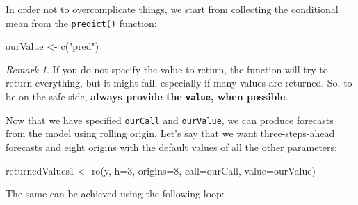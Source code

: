 \documentclass[
]{book}
\newenvironment{Shaded}{\begin{snugshade}}{\end{snugshade}}
\newcommand{\AttributeTok}[1]{\textcolor[rgb]{0.77,0.63,0.00}{#1}}
\newcommand{\DecValTok}[1]{\textcolor[rgb]{0.00,0.00,0.81}{#1}}
\newcommand{\FunctionTok}[1]{\textcolor[rgb]{0.00,0.00,0.00}{#1}}
\newcommand{\NormalTok}[1]{#1}
\newcommand{\OtherTok}[1]{\textcolor[rgb]{0.56,0.35,0.01}{#1}}
\newcommand{\StringTok}[1]{\textcolor[rgb]{0.31,0.60,0.02}{#1}}
\theoremstyle{definition}
\theoremstyle{definition}
\theoremstyle{definition}
\theoremstyle{definition}
\theoremstyle{remark}
\newtheorem*{remark}{Remark}
\begin{document}
In order not to overcomplicate things, we start from collecting the conditional mean from the \texttt{predict()} function:

\begin{Shaded}
\begin{Highlighting}[]
\NormalTok{ourValue }\OtherTok{\textless{}{-}} \FunctionTok{c}\NormalTok{(}\StringTok{"pred"}\NormalTok{)}
\end{Highlighting}
\end{Shaded}

\begin{remark}
If you do not specify the value to return, the function will try to return everything, but it might fail, especially if many values are returned. So, to be on the safe side, \textbf{always provide the \texttt{value}, when possible}.
\end{remark}

Now that we have specified \texttt{ourCall} and \texttt{ourValue}, we can produce forecasts from the model using rolling origin. Let's say that we want three-steps-ahead forecasts and eight origins with the default values of all the other parameters:

\begin{Shaded}
\begin{Highlighting}[]
\NormalTok{returnedValues1 }\OtherTok{\textless{}{-}} \FunctionTok{ro}\NormalTok{(y, }\AttributeTok{h=}\DecValTok{3}\NormalTok{, }\AttributeTok{origins=}\DecValTok{8}\NormalTok{,}
                      \AttributeTok{call=}\NormalTok{ourCall, }\AttributeTok{value=}\NormalTok{ourValue)}
\end{Highlighting}
\end{Shaded}

The same can be achieved using the following loop:
\end{document}
